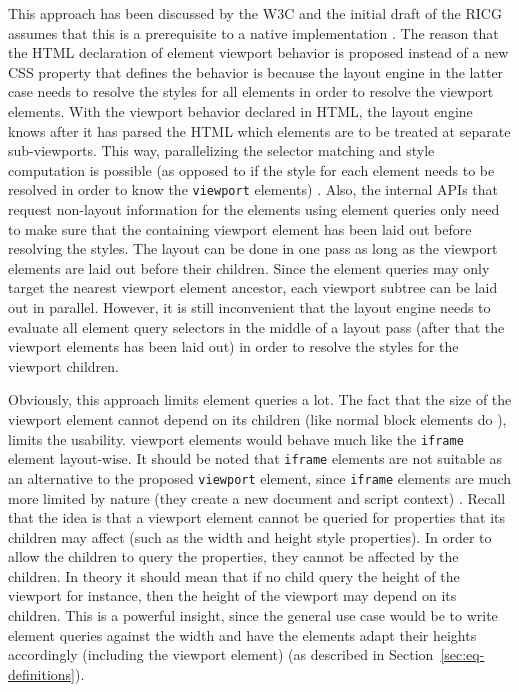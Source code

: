 \documentclass[a4paper,11pt]{kth-mag}
\newcommand{\code}[1]{\texttt{#1}}
\begin{document}
      This approach has been discussed by the \gls{W3C} and the initial draft of the \gls{RICG} assumes that this is a prerequisite to a \gls{native} implementation \cite{w3c_eq_mail,ricg_irc_log}.
      The reason that the \gls{HTML} declaration of element \gls{viewport} behavior is proposed instead of a new \gls{CSS} property that defines the behavior is because the \gls{layout engine} in the latter case needs to resolve the styles for all \glspl{element} in order to resolve the \gls{viewport} \glspl{element}.
      With the \gls{viewport} behavior declared in \gls{HTML}, the \gls{layout engine} knows after it has parsed the \gls{HTML} which \glspl{element} are to be treated at separate sub-\glspl{viewport}.
      This way, parallelizing the selector matching and style computation is possible (as opposed to if the style for each element needs to be resolved in order to know the \code{viewport} \glspl{element}) \cite{w3c_eq_mail}.
      Also, the internal \glspl{API} that request non-layout information for the \glspl{element} using element queries only need to make sure that the containing \gls{viewport} \gls{element} has been laid out before resolving the styles.
      The layout can be done in one pass as long as the \gls{viewport} \glspl{element} are laid out before their children.
      Since the element queries may only target the nearest \gls{viewport} \gls{element} ancestor, each \gls{viewport} subtree can be laid out in parallel.
      However, it is still inconvenient that the \gls{layout engine} needs to evaluate all element query selectors in the middle of a layout pass (after that the \gls{viewport} \glspl{element} has been laid out) in order to resolve the styles for the \gls{viewport} children.

      Obviously, this approach limits element queries a lot.
      The fact that the size of the \gls{viewport} \gls{element} cannot depend on its children (like normal block \glspl{element} do \cite{w3c_css21}), limits the usability.
      \Gls{viewport} \glspl{element} would behave much like the \code{iframe} \gls{element} layout-wise.
      It should be noted that \code{iframe} \glspl{element} are not suitable as an alternative to the proposed \code{viewport} \gls{element}, since \code{iframe} \glspl{element} are much more limited by nature (they create a new \gls{document} and script context) \cite{w3c_css21}.
      Recall that the idea is that a \gls{viewport} element cannot be queried for properties that its children may affect (such as the width and height style properties).
      In order to allow the children to query the properties, they cannot be affected by the children.
      In theory it should mean that if no child query the height of the \gls{viewport} for instance, then the height of the \gls{viewport} may depend on its children.
      This is a powerful insight, since the general use case would be to write element queries against the width and have the \glspl{element} adapt their heights accordingly (including the \gls{viewport} \gls{element}) (as described in Section~\ref{sec:eq-definitions}).
\end{document}
